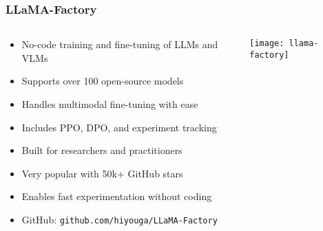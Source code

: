 \begin{frame}[fragile]\frametitle{LLaMA-Factory}
\begin{columns}
    \begin{column}[T]{0.6\linewidth}
      \begin{itemize}
        \item No-code training and fine-tuning of LLMs and VLMs
        \item Supports over 100 open-source models
        \item Handles multimodal fine-tuning with ease
        \item Includes PPO, DPO, and experiment tracking
        \item Built for researchers and practitioners
        \item Very popular with 50k+ GitHub stars
        \item Enables fast experimentation without coding
        \item GitHub: \texttt{github.com/hiyouga/LLaMA-Factory}
      \end{itemize}
    \end{column}
    \begin{column}[T]{0.4\linewidth}
        \begin{center}
        \texttt{[image: llama-factory]}
        \end{center}	
    \end{column}
\end{columns}
\end{frame}

